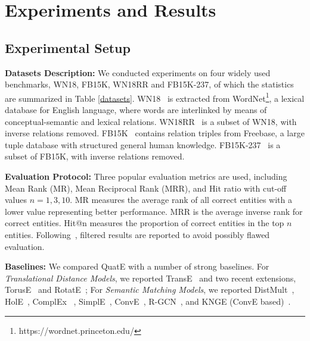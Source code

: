 \documentclass{article}
\begin{document}
\section{Experiments and Results}
\subsection{Experimental Setup}
\textbf{Datasets Description:} We conducted experiments on four widely used benchmarks, WN18, FB15K, WN18RR and FB15K-237, of which the statistics are summarized in Table \ref{datasets}.  WN18~\citep{bordes2013translating} is extracted from WordNet\footnote{https://wordnet.princeton.edu/}, a lexical database for English language, where words are interlinked by means of conceptual-semantic and lexical relations. WN18RR~\citep{dettmers2018convolutional} is a subset of WN18, with inverse relations removed. FB15K~\citep{bordes2013translating} contains relation triples from Freebase, a large tuple database with structured general human knowledge. FB15K-237~\citep{toutanova2015observed} is a subset of FB15K, with inverse relations removed.




\textbf{Evaluation Protocol:} Three popular evaluation metrics are used, including Mean Rank (MR), Mean Reciprocal Rank (MRR), and Hit ratio with cut-off values $n = 1,3,10$. MR measures the average rank of all correct entities with a lower value representing better performance. MRR is the average inverse rank for correct entities. Hit@n measures the proportion of correct entities in the top $n$ entities. Following~\citet{bordes2013translating}, filtered results are reported to avoid possibly flawed evaluation.

\textbf{Baselines:} We compared QuatE with a number of strong baselines. For \textit{Translational Distance Models}, we reported TransE~\citep{bordes2013translating} and two recent extensions, TorusE~\citep{ebisu2018toruse} and RotatE~\citep{sun2019rotate}; For \textit{Semantic Matching Models}, we reported DistMult~\citep{yang2014embedding}, HolE~\citep{nickel2016holographic}, ComplEx~\citep{trouillon2016complex} , SimplE~\citep{kazemi2018simple}, ConvE~\citep{dettmers2018convolutional}, R-GCN~\citep{schlichtkrull2018modeling}, and KNGE (ConvE based)~\citep{wang2018knowledge}.
\end{document}
